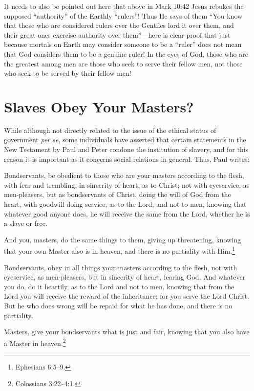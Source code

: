 \documentclass[letterpaper,12pt]{article}
\newenvironment{squotation}
  {\small\quotation}
  {\endquotation\normalsize}
\begin{document}
It needs to also be pointed out here that above in Mark 10:42 Jesus rebukes the supposed ``authority'' of the Earthly ``rulers''! Thus He says of them ``You know that those who are considered rulers over the Gentiles lord it over them, and their great ones exercise authority over them''---here is clear proof that just because mortals on Earth may consider someone to be a ``ruler'' does not mean that God considers them to be a genuine ruler! In the eyes of God, those who are the greatest among men are those who seek to serve their fellow men, not those who seek to be served by their fellow men!

\section{Slaves Obey Your Masters?}
\label{sec:SlavesObeyYourMasters}

While although not directly related to the issue of the ethical status of government \emph{per se}, some individuals have asserted that certain statements in the New Testament by Paul and Peter condone the institution of slavery, and for this reason it is important as it concerns social relations in general. Thus, Paul writes:

\begin{squotation}
Bondservants, be obedient to those who are your masters according to the flesh, with fear and trembling, in sincerity of heart, as to Christ; not with eyeservice, as men-pleasers, but as bondservants of Christ, doing the will of God from the heart, with goodwill doing service, as to the Lord, and not to men, knowing that whatever good anyone does, he will receive the same from the Lord, whether he is a slave or free.

And you, masters, do the same things to them, giving up threatening, knowing that your own Master also is in heaven, and there is no partiality with Him.\footnote{Ephesians 6:5--9.}
\end{squotation}

\begin{squotation}
Bondservants, obey in all things your masters according to the flesh, not with eyeservice, as men-pleasers, but in sincerity of heart, fearing God. And whatever you do, do it heartily, as to the Lord and not to men, knowing that from the Lord you will receive the reward of the inheritance; for you serve the Lord Christ. But he who does wrong will be repaid for what he has done, and there is no partiality.

Masters, give your bondservants what is just and fair, knowing that you also have a Master in heaven.\footnote{Colossians 3:22--4:1.}
\end{squotation}
\end{document}

